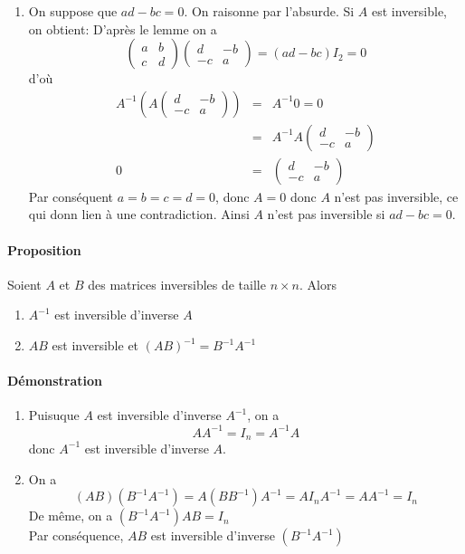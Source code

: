 \begin{enumerate}
\item On suppose que $a d - b c = 0$. On raisonne par l'absurde. Si $A$ est inversible, on obtient: D'après le lemme on a
$$\begin{pmatrix} a & b \\ c & d \end{pmatrix} \begin{pmatrix} d & -b \\ -c & a \end{pmatrix} = (a d - b c) I_2 = 0$$
d'où
\begin{eqnarray*}
  A^{-1} \left( A \begin{pmatrix} d & -b \\ -c & a \end{pmatrix} \right) &=& A^{-1} 0 = 0 \\
    &=& A^{-1} A \begin{pmatrix} d & -b \\ -c & a \end{pmatrix} \\
  0 &=& \begin{pmatrix} d & -b \\ -c & a \end{pmatrix}
\end{eqnarray*}
Par conséquent $a = b = c = d = 0$, donc $A = 0$ donc $A$ n'est pas inversible, ce qui donn lien à une contradiction. Ainsi $A$ n'est pas inversible si $a d - b c = 0$.
\end{enumerate}

\paragraph{Proposition} Soient $A$ et $B$ des matrices inversibles de taille $n \times n$. Alors
\begin{enumerate}
  \item $A^{-1}$ est inversible d'inverse $A$
  \item $A B$ est inversible et $(A B)^{-1} = B^{-1} A^{-1}$
\end{enumerate}

\paragraph{Démonstration}
\begin{enumerate}
  \item Puisuque $A$ est inversible d'inverse $A^{-1}$, on a
    $$A A^{-1} = I_n = A^{-1} A$$
    donc $A^{-1}$ est inversible d'inverse $A$.
  \item On a
    $$(A B)(B^{-1} A^{-1}) = A (B B^{-1}) A^{-1} = A I_n A^{-1} = A A^{-1} = I_n$$
    De même, on a $(B^{-1} A^{-1}) A B = I_n$ \\
    Par conséquence, $A B$ est inversible d'inverse $(B^{-1} A^{-1})$
\end{enumerate}

